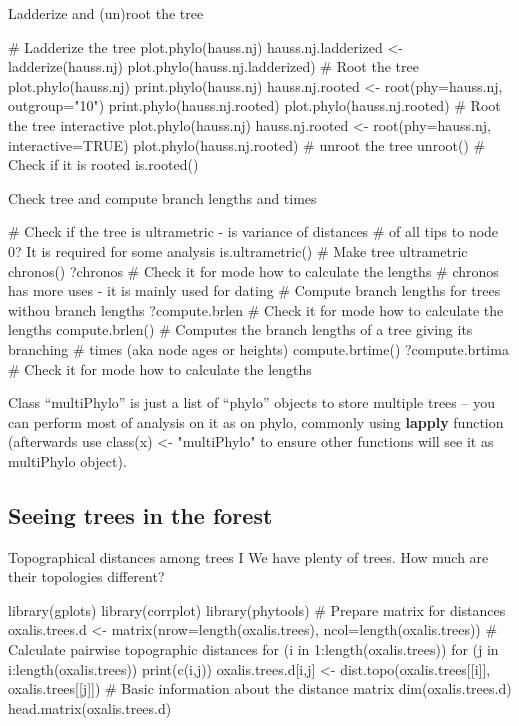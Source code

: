 \documentclass[compress, ucs, xelatex, 11pt, xcolor=svgnames,
  hyperref={
    bookmarks=true,
    unicode=true,
    colorlinks=true,
    pdftitle={Molecular data in R},
    plainpages=false,
    pdfauthor={Vojtech Zeisek},
    pdfsubject={Course about phylogeny and evolution in R},
    pdfcreator={XeLaTeX},
    pdfkeywords={R, evolution, phylogeny, molecular data},
    linkcolor=Tomato,
    anchorcolor=SaddleBrown,
    citecolor=Goldenrod,
    filecolor=DarkMagenta,
    menucolor=Sienna,
    urlcolor=DarkTurquoise,
    pdftex},
  url={hyphens, lowtilde} %
  ]{beamer}
\begin{document}
\begin{frame}[fragile]{Ladderize and (un)root the tree}
  \begin{spluscode}
    # Ladderize the tree
    plot.phylo(hauss.nj)
    hauss.nj.ladderized <- ladderize(hauss.nj)
    plot.phylo(hauss.nj.ladderized)
    # Root the tree
    plot.phylo(hauss.nj)
    print.phylo(hauss.nj)
    hauss.nj.rooted <- root(phy=hauss.nj, outgroup="10")
    print.phylo(hauss.nj.rooted)
    plot.phylo(hauss.nj.rooted)
    # Root the tree interactive
    plot.phylo(hauss.nj)
    hauss.nj.rooted <- root(phy=hauss.nj, interactive=TRUE)
    plot.phylo(hauss.nj.rooted)
    # unroot the tree
    unroot()
    # Check if it is rooted
    is.rooted()
  \end{spluscode}
\end{frame}

\begin{frame}[fragile]{Check tree and compute branch lengths and times}
  \begin{spluscode}
    # Check if the tree is ultrametric - is variance of distances
    # of all tips to node 0? It is required for some analysis
    is.ultrametric()
    # Make tree ultrametric
    chronos()
    ?chronos # Check it for mode how to calculate the lengths
    # chronos has more uses - it is mainly used for dating
    # Compute branch lengths for trees withou branch lengths
    ?compute.brlen # Check it for mode how to calculate the lengths
    compute.brlen()
    # Computes the branch lengths of a tree giving its branching
    # times (aka node ages or heights)
    compute.brtime()
    ?compute.brtima # Check it for mode how to calculate the lengths
  \end{spluscode}
Class ``multiPhylo'' is just a list of ``phylo'' objects to store multiple trees -- you can perform most of analysis on it as on phylo, commonly using \textbf{lapply} function (afterwards use class(x) <- "multiPhylo" to ensure other functions will see it as multiPhylo object).
\end{frame}

\subsection{Seeing trees in the forest}

\begin{frame}[fragile]{Topographical distances among trees I}
We have plenty of trees. How much are their topologies different?
  \begin{spluscode}
    library(gplots)
    library(corrplot)
    library(phytools)
    # Prepare matrix for distances
    oxalis.trees.d <- matrix(nrow=length(oxalis.trees),
      ncol=length(oxalis.trees))
    # Calculate pairwise topographic distances
    for (i in 1:length(oxalis.trees)) {
      for (j in i:length(oxalis.trees)) {
        print(c(i,j))
        oxalis.trees.d[i,j] <- dist.topo(oxalis.trees[[i]],
          oxalis.trees[[j]])
      }
    }
    # Basic information about the distance matrix
    dim(oxalis.trees.d)
    head.matrix(oxalis.trees.d)
  \end{spluscode}
\end{frame}
\end{document}
